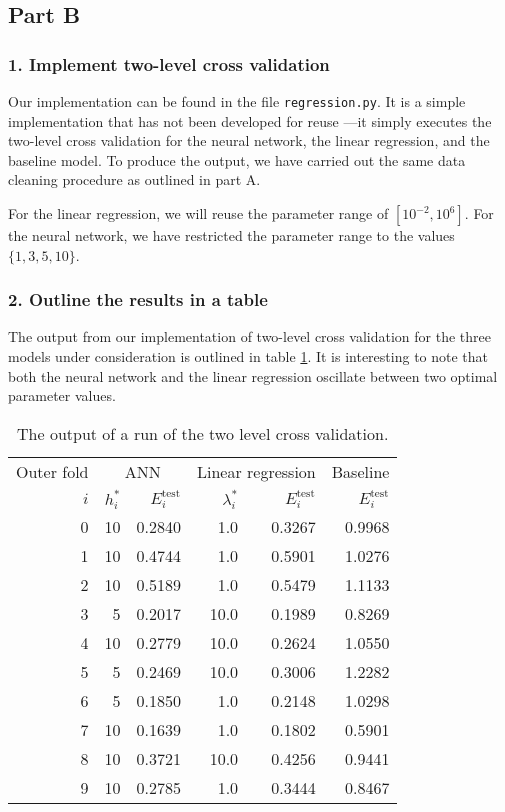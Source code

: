 \subsection*{Part B}

\subsubsection*{1. Implement two-level cross validation}

Our implementation can be found in the file \texttt{regression.py}.
It is a simple implementation that has not been developed for reuse
—it simply executes the two-level cross validation for
the neural network, the linear regression, and the baseline model.
To produce the output, we have carried out the same data cleaning procedure
as outlined in part A.

For the linear regression, we will reuse the parameter range of \([10^{-2}, 10^6]\).
For the neural network, we have restricted the parameter range to the values
\(\{1, 3, 5, 10\}\).

\subsubsection*{2. Outline the results in a table}

The output from our implementation of two-level cross validation
for the three models under consideration is outlined in table \ref{table:two-cv}.
It is interesting to note that both the neural network and the linear
regression oscillate between two optimal parameter values.

\begin{table}[h]
	\centering
	\begin{tabular}{r r r r r r}
		\hline
		\multicolumn{1}{c}{Outer fold} & \multicolumn{2}{c}{ANN}
		& \multicolumn{2}{c}{Linear regression} & \multicolumn{1}{c}{Baseline} \\
		\(i\) & \(h_i^*\) & \(E_i^\text{test}\)
		& \(\lambda_i^*\) & \(E_i^\text{test}\) & \(E_i^\text{test}\) \\
		\hline
		0 & 10 & 0.2840 &  1.0 & 0.3267 & 0.9968 \\
		1 & 10 & 0.4744 &  1.0 & 0.5901 & 1.0276 \\
		2 & 10 & 0.5189 &  1.0 & 0.5479 & 1.1133 \\
		3 &  5 & 0.2017 & 10.0 & 0.1989 & 0.8269 \\
		4 & 10 & 0.2779 & 10.0 & 0.2624 & 1.0550 \\
		5 &  5 & 0.2469 & 10.0 & 0.3006 & 1.2282 \\
		6 &	 5 & 0.1850 &  1.0 & 0.2148 & 1.0298 \\
		7 & 10 & 0.1639 &  1.0 & 0.1802 & 0.5901 \\
		8 & 10 & 0.3721 & 10.0 & 0.4256 & 0.9441 \\
		9 & 10 & 0.2785 &  1.0 & 0.3444 & 0.8467 \\
		\hline
	\end{tabular}
	\caption{The output of a run of the two level cross validation.}
	\label{table:two-cv}
\end{table}

